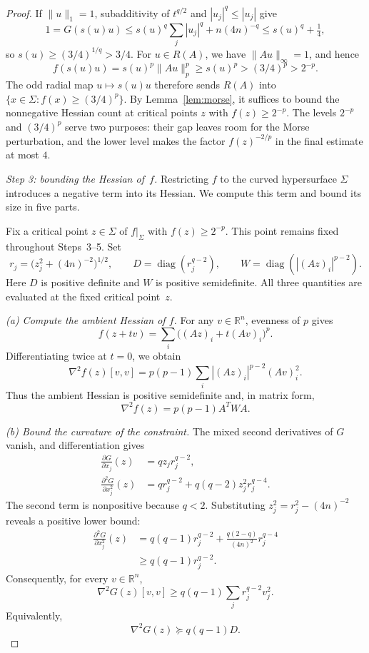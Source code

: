 \documentclass[11pt]{article}
\theoremstyle{remark}
\DeclareMathOperator{\diag}{diag}
\newcommand{\R}{\mathbb R}
\begin{document}
\begin{proof}
If $\|u\|_1=1$, subadditivity of $t^{q/2}$ and
$|u_j|^q\leq|u_j|$ give
\[
 1=G(s(u)u)
 \leq s(u)^q\sum_j|u_j|^q+n(4n)^{-q}
 \leq s(u)^q+\tfrac14,
\]
so $s(u)\geq(3/4)^{1/q}>3/4$.
For $u\in R(A)$, we have $\|Au\|_\infty=1$, and hence
\begin{equation}\label{eq:levels}
 f(s(u)u)=s(u)^p\|Au\|_p^p
 \geq s(u)^p>(3/4)^p>2^{-p}.
\end{equation}
The odd radial map $u\mapsto s(u)u$ therefore sends $R(A)$ into
$\{x\in\Sigma:f(x)\geq(3/4)^p\}$.
By Lemma~\ref{lem:morse}, it suffices to bound the nonnegative
Hessian count at critical points $z$ with $f(z)\geq2^{-p}$.
The levels $2^{-p}$ and $(3/4)^p$ serve two purposes: their gap
leaves room for the Morse perturbation, and the lower level makes
the factor $f(z)^{-2/p}$ in the final estimate at most $4$.


\smallskip
\noindent\emph{Step 3: bounding the Hessian of~$f$.}
Restricting $f$ to the curved hypersurface $\Sigma$ introduces a
negative term into its Hessian. We compute this term and bound its
size in five parts.

Fix a critical point $z\in\Sigma$ of $f|_\Sigma$ with
$f(z)\geq2^{-p}$. This point remains fixed throughout Steps~3--5.
Set
\[
 r_j=\bigl(z_j^2+(4n)^{-2}\bigr)^{1/2},\qquad
 D=\diag(r_j^{q-2}),\qquad
 W=\diag(|(Az)_i|^{p-2}).
\]
Here $D$ is positive definite and $W$ is positive semidefinite.
All three quantities are evaluated at the fixed critical point~$z$.

\smallskip
\noindent\emph{(a) Compute the ambient Hessian of $f$.}
For any $v\in\R^n$, evenness of $p$ gives
\[
 f(z+tv)=\sum_i\bigl((Az)_i+t(Av)_i\bigr)^p.
\]
Differentiating twice at $t=0$, we obtain
\[
 \nabla^2f(z)[v,v]
 =p(p-1)\sum_i|(Az)_i|^{p-2}(Av)_i^2.
\]
Thus the ambient Hessian is positive semidefinite and, in matrix form,
\[
 \nabla^2f(z)=p(p-1)A^TWA.
\]

\smallskip
\noindent\emph{(b) Bound the curvature of the constraint.}
The mixed second derivatives of $G$ vanish, and differentiation gives
\begin{align*}
 \frac{\partial G}{\partial x_j}(z)
 &=qz_jr_j^{q-2},\\
 \frac{\partial^2G}{\partial x_j^2}(z)
 &=qr_j^{q-2}+q(q-2)z_j^2r_j^{q-4}.
\end{align*}
The second term is nonpositive because $q<2$.
Substituting $z_j^2=r_j^2-(4n)^{-2}$ reveals a positive lower bound:
\begin{align*}
 \frac{\partial^2G}{\partial x_j^2}(z)
 &=q(q-1)r_j^{q-2}
   +\frac{q(2-q)}{(4n)^2}r_j^{q-4}\\
 &\geq q(q-1)r_j^{q-2}.
\end{align*}
Consequently, for every $v\in\R^n$,
\[
 \nabla^2G(z)[v,v]
 \geq q(q-1)\sum_jr_j^{q-2}v_j^2.
\]
Equivalently,
\[
 \nabla^2G(z)\succeq q(q-1)D.
\]


\end{proof}
\end{document}
